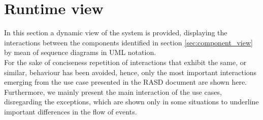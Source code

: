\section{Runtime view}
In this section a dynamic view of the system is provided, displaying the interactions between the components identified in section \ref{sec:component_view} by mean of sequence diagrams in UML notation.\\
For the sake of conciseness repetition of interactions that exhibit the same, or similar, behaviour has been avoided, hence, only the most important interactions emerging from the use case presented in the RASD document are shown here. Furthermore, we mainly present the main interaction of the use cases, disregarding the exceptions, which are shown only in some situations to underline important differences in the flow of events.

\pagebreak
